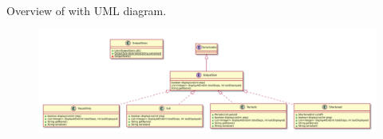 Overview of \texttt{\pkg} with UML diagram.

\begin{figure}[H]
	\centering
	\includegraphics[width=\textwidth]{packageDiagrams/modelOutputPackage}
\end{figure}